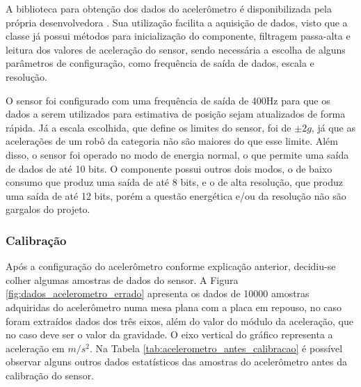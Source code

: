 \documentclass[acronym, symbols, table]{fei}
\begin{document}
	A biblioteca para obtenção dos dados do acelerômetro é disponibilizada pela própria desenvolvedora \cite{accelero_repository}. Sua utilização facilita a aquisição de dados, visto que a classe já possui métodos para inicialização do componente, filtragem passa-alta e leitura dos valores de aceleração do sensor, sendo necessária a escolha de alguns parâmetros de configuração, como frequência de saída de dados, escala e resolução.
	
	O sensor foi configurado com uma frequência de saída de 400Hz para que os dados a serem utilizados para estimativa de posição sejam atualizados de forma rápida. Já a escala escolhida, que define os limites do sensor, foi de $\pm2g$, já que as acelerações de um robô da categoria  não são maiores do que esse limite. Além disso, o sensor foi operado no modo de energia normal, o que permite uma saída de dados de até 10 bits. O componente possui outros dois modos, o de baixo consumo que produz uma saída de até 8 bits, e o de alta resolução, que produz uma saída de até 12 bits, porém a questão energética e/ou da resolução não são gargalos do projeto.
	
	\subsubsection{Calibração}
	
	Após a configuração do acelerômetro conforme explicação anterior, decidiu-se colher algumas amostras de dados do sensor. A Figura \ref{fig:dados_acelerometro_errado} apresenta os dados de 10000 amostras adquiridas do acelerômetro numa mesa plana com a placa em repouso, no caso foram extraídos dados dos três eixos, além do valor do módulo da aceleração, que no caso deve ser o valor da gravidade. O eixo vertical do gráfico representa a aceleração em $m/s^2$. Na Tabela \ref{tab:acelerometro_antes_calibracao} é possível observar alguns outros dados estatísticos das amostras do acelerômetro antes da calibração do sensor.
	
\end{document}
